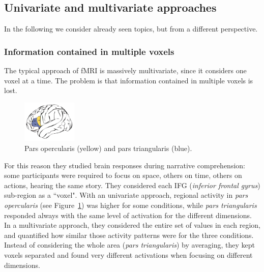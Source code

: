 \subsection{Univariate and multivariate approaches}
In the following we consider already seen topics, but from a different perspective.

\subsubsection{Information contained in multiple voxels}
The typical approach of fMRI is massively multivariate, since it considers one voxel at a time. The problem is that information contained in multiple voxels is lost.

\begin{figure}
  \centering
  \includegraphics[width=0.23\textwidth]{images/ptri.png}
  \caption{Pars opercularis (yellow) and pars triangularis (blue).}
  \label{fig:ptri}
\end{figure}

For this reason they studied brain responses during narrative comprehension: some participants were required to focus on space, others on time, others on actions, hearing the same story.
They considered each IFG (\textit{inferior frontal gyrus}) sub-region as a ``voxel".
With an univariate approach, regional activity in \textit{pars opercularis} (see Figure~\ref{fig:ptri}) was higher for some conditions, while \textit{pars triangularis} responded always with the same level of activation for the different dimensions.
In a multivariate approach, they considered the entire set of values in each region, and quantified how similar those activity patterns were for the three conditions. Instead of considering the whole area (\textit{pars triangularis}) by averaging, they kept voxels separated and found very different activations when focusing on different dimensions.

